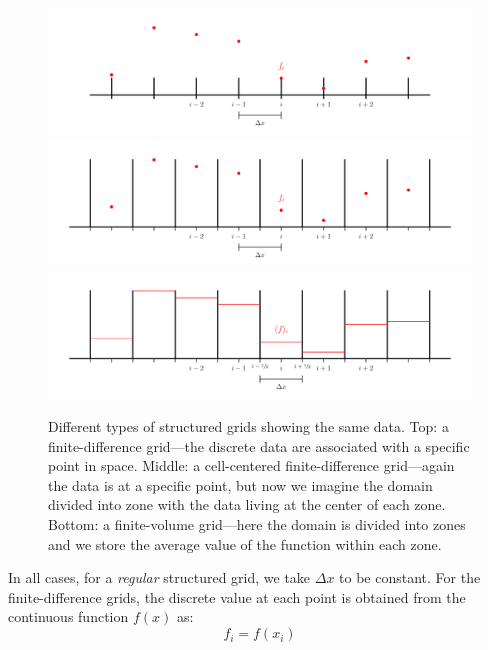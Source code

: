 \begin{figure}[t]
\centering
\includegraphics[width=\linewidth]{fd_grid} \\
\includegraphics[width=\linewidth]{ccfd_grid} \\
\includegraphics[width=\linewidth]{fv_grid}
\caption[Types of structured grids]{\label{fig:grids} Different types of structured grids showing
  the same data.  Top:
  a finite-difference grid---the discrete data are associated with a
  specific point in space.  Middle: a cell-centered finite-difference
  grid---again the data is at a specific point, but now we imagine the
  domain divided into zone with the data living at the center of each
  zone.  Bottom: a finite-volume grid---here the domain is divided
  into zones and we store the average value of the function within
  each zone.}
\end{figure}

In all cases, for a {\em regular} structured grid, we take $\Delta x$
to be constant.  For the finite-difference grids, the discrete value at
each point is obtained from the continuous function $f(x)$ as:
\begin{equation}
f_i = f(x_i)
\end{equation}


